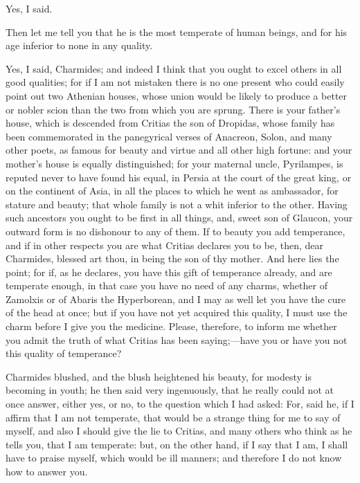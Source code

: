 \documentclass[11pt,letter]{article}
\begin{document}
\par  Yes, I said.

\par  Then let me tell you that he is the most temperate of human beings, and for his age inferior to none in any quality.

\par  Yes, I said, Charmides; and indeed I think that you ought to excel others in all good qualities; for if I am not mistaken there is no one present who could easily point out two Athenian houses, whose union would be likely to produce a better or nobler scion than the two from which you are sprung. There is your father's house, which is descended from Critias the son of Dropidas, whose family has been commemorated in the panegyrical verses of Anacreon, Solon, and many other poets, as famous for beauty and virtue and all other high fortune: and your mother's house is equally distinguished; for your maternal uncle, Pyrilampes, is reputed never to have found his equal, in Persia at the court of the great king, or on the continent of Asia, in all the places to which he went as ambassador, for stature and beauty; that whole family is not a whit inferior to the other. Having such ancestors you ought to be first in all things, and, sweet son of Glaucon, your outward form is no dishonour to any of them. If to beauty you add temperance, and if in other respects you are what Critias declares you to be, then, dear Charmides, blessed art thou, in being the son of thy mother. And here lies the point; for if, as he declares, you have this gift of temperance already, and are temperate enough, in that case you have no need of any charms, whether of Zamolxis or of Abaris the Hyperborean, and I may as well let you have the cure of the head at once; but if you have not yet acquired this quality, I must use the charm before I give you the medicine. Please, therefore, to inform me whether you admit the truth of what Critias has been saying;—have you or have you not this quality of temperance?

\par  Charmides blushed, and the blush heightened his beauty, for modesty is becoming in youth; he then said very ingenuously, that he really could not at once answer, either yes, or no, to the question which I had asked: For, said he, if I affirm that I am not temperate, that would be a strange thing for me to say of myself, and also I should give the lie to Critias, and many others who think as he tells you, that I am temperate: but, on the other hand, if I say that I am, I shall have to praise myself, which would be ill manners; and therefore I do not know how to answer you.
\end{document}
